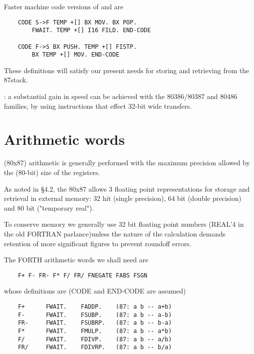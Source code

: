 Faster machine code versions of  and  are

\begin{lstlisting}
    CODE S->F TEMP +[] BX MOV. BX POP.
        FWAIT. TEMP +[] I16 FILD. END-CODE

    CODE F->S BX PUSH. TEMP +[] FISTP.
        BX TEMP +[] MOV. END-CODE
\end{lstlisting}

These definitions will satisfy our present needs for storing and retrieving from the 87stack.

\leftbar[1\linewidth]
\Note: a substantial gain in speed can be achieved with the
80386/80387 and 80486 families, by using instructions that effect
32-bit wide transfers\footnotemark.
\endleftbar
{}

\section{Arithmetic words}

 (80x87) arithmetic is generally performed with the maximum precision allowed by the (80-bit) size of the registers.

As noted in \S4.2, the 80x87 allows 3 floating point representations for storage and retrieval in external memory: 32 hit (single precision), 64 bit (double precision) and 80 bit ("temporary real").

To conserve memory we generally use 32 bit floating point numbers (REAL'4 in the old FORTRAN parlance)unless the nature of the calculation demands retention of more significant figures to prevent roundoff errors.

The FORTH arithmetic words we shall need are
\begin{lstlisting}
    F+ F- FR- F* F/ FR/ FNEGATE FABS FSGN
\end{lstlisting}
whose definitions are (CODE and END-CODE are assumed)

\begin{lstlisting}
    F+      FWAIT.    FADDP.    (87: a b -- a+b)
    F-      FWAIT.    FSUBP.    (87: a b -- a-b)
    FR-     FWAIT.    FSUBRP.   (87: a b -- b-a)
    F*      FWAIT.    FMULP.    (87: a b -- a*b)
    F/      FWAIT.    FDIVP.    (87: a b -- a/b)
    FR/     FWAIT.    FDIVRP.   (87: a b -- b/a)
\end{lstlisting}


